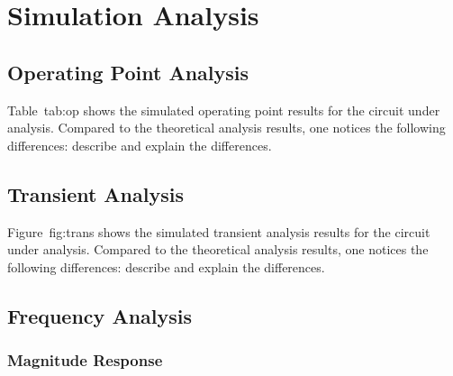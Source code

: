 \section{Simulation Analysis}
\label{sec:simulation}

\subsection{Operating Point Analysis}

Table~{tab:op} shows the simulated operating point results for the circuit
under analysis. Compared to the theoretical analysis results, one notices the
following differences: describe and explain the differences.


\lipsum[1-1]


\subsection{Transient Analysis}

Figure~{fig:trans} shows the simulated transient analysis results for the
circuit under analysis. Compared to the theoretical analysis results, one
notices the following differences: describe and explain the differences.


\lipsum[1-1]



\subsection{Frequency Analysis}

\subsubsection{Magnitude Response}

